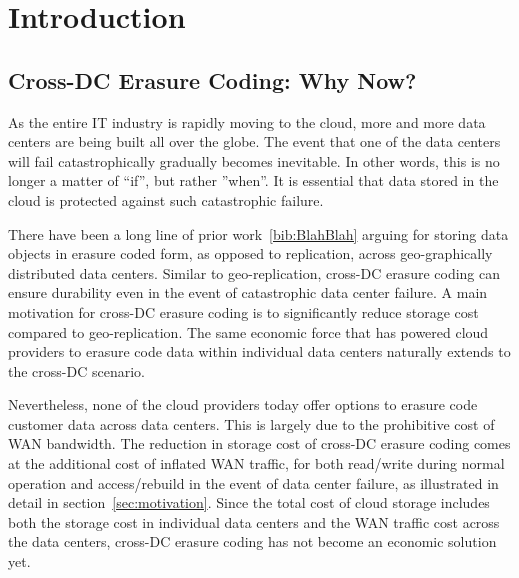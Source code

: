 \section{Introduction}

\subsection{Cross-DC Erasure Coding: Why Now?}

As the entire IT industry is rapidly moving to the cloud, more and more data centers are being built all over the globe. The event that one of the data centers will fail catastrophically gradually becomes inevitable. In other words, this is no longer a matter of ``if'', but rather ''when''. It is essential that data stored in the cloud is protected against such catastrophic failure.

There have been a long line of prior work~\ref{bib:BlahBlah} arguing for storing data objects in erasure coded form, as opposed to replication, across geo-graphically distributed data centers. Similar to geo-replication, cross-DC erasure coding can ensure durability even in the event of catastrophic data center failure. A main motivation for cross-DC erasure coding is to significantly reduce storage cost compared to geo-replication. The same economic force that has powered cloud providers to erasure code data within individual data centers naturally extends to the cross-DC scenario.

Nevertheless, none of the cloud providers today offer options to erasure code customer data across data centers. This is largely due to the prohibitive cost of WAN bandwidth. The reduction in storage cost of cross-DC erasure coding comes at the additional cost of inflated WAN traffic, for both read/write during normal operation and access/rebuild in the event of data center failure, as illustrated in detail in section~\ref{sec:motivation}.
 Since the total cost of cloud storage includes both the storage cost in individual data centers and the WAN traffic cost across the data centers, cross-DC erasure coding has not become an economic solution yet.

